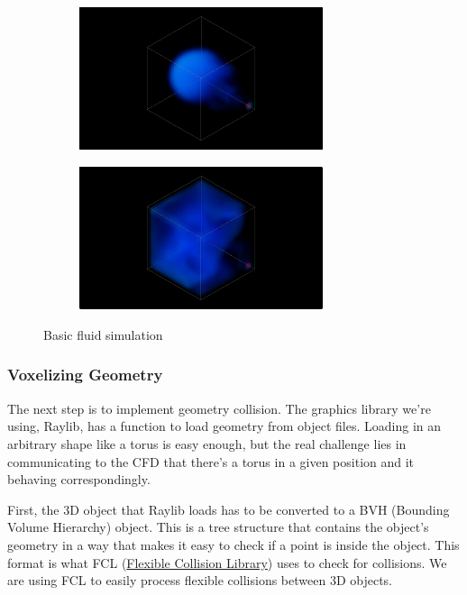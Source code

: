 \documentclass[a4paper,12pt,titlepage]{article}
\begin{document}
\begin{figure}[H]
    \centering
    \begin{subfigure}[t]{0.45\textwidth}
        \centering
        \includegraphics[height=1.65in]{resources/core1.png}
    \end{subfigure}
    \hfill
    \begin{subfigure}[t]{0.45\textwidth}
        \centering
        \includegraphics[height=1.65in]{resources/core2.png}
    \end{subfigure}
	\caption{Basic fluid simulation}
	\label{fig:core}
\end{figure}

\subsubsection{Voxelizing Geometry}
The next step is to implement geometry collision. The graphics library we're using,
Raylib, has a function to load geometry from object files. Loading in an arbitrary shape
like a torus is easy enough, but the real challenge lies in communicating to the
CFD that there's a torus in a given position and it behaving correspondingly.

First, the 3D object that Raylib loads has to be converted to a BVH (Bounding Volume
Hierarchy) object. This is a tree structure that contains the object's geometry in
a way that makes it easy to check if a point is inside the object. This format
is what FCL (\href{https://github.com/flexible-collision-library/fcl}{Flexible Collision Library})
uses to check for collisions. We are using FCL to easily process flexible
collisions between 3D objects.
\end{document}
